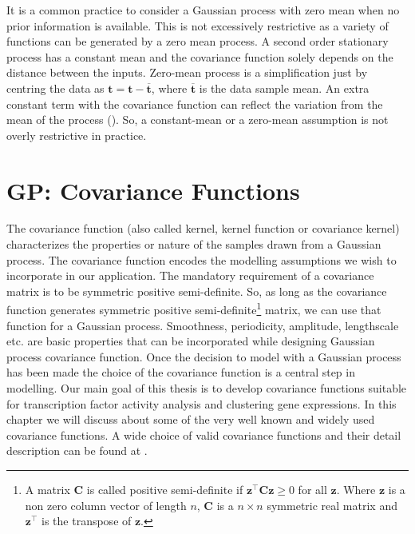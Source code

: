 It is a common practice to consider a Gaussian process with zero mean when no prior information is available. This is not excessively restrictive as a variety of functions can be generated by a zero mean process. A second order stationary process has a constant mean and the covariance function solely depends on the distance between the inputs. Zero-mean process is a simplification just by centring the data as $\textbf{t} = \textbf{t} - \overline{\textbf{t}}$, where $\overline{\textbf{t}}$ is the data sample mean. An extra constant term with the covariance function can reflect the variation from the mean of the process (\cite{MacKay:2003}). So, a constant-mean or a zero-mean assumption is not overly restrictive in practice.

\section{GP: Covariance Functions}
The covariance function (also called kernel, kernel function or covariance kernel) characterizes the properties or nature of the samples drawn from a Gaussian process. The covariance function encodes the modelling assumptions we wish to incorporate in our application. The mandatory requirement of a covariance matrix is to be symmetric positive semi-definite. So, as long as the covariance function generates symmetric positive semi-definite\footnote{A matrix $\textbf{C}$ is called positive semi-definite if $\textbf{z}^{\top}\textbf{C}\textbf{z} \geq 0$ for all $\textbf{z}$. Where $\textbf{z}$ is a non zero column vector of length $n$, $\textbf{C}$ is a $n\times n$ symmetric real matrix and $\textbf{z}^{\top}$ is the transpose of $\textbf{z}$.} matrix, we can use that function for a Gaussian process. Smoothness, periodicity, amplitude, lengthscale etc. are basic properties that can be incorporated while designing Gaussian process covariance function. Once the decision to model with a Gaussian process has been made the choice of the covariance function is a central step in modelling. Our main goal of this thesis is to develop  covariance functions suitable for transcription factor activity analysis and clustering gene expressions. In this chapter we will discuss about some of the very well known and widely used covariance functions. A wide choice of valid covariance functions and their detail description can be found at \cite{Rasmussen_and_Williams:2006}.

